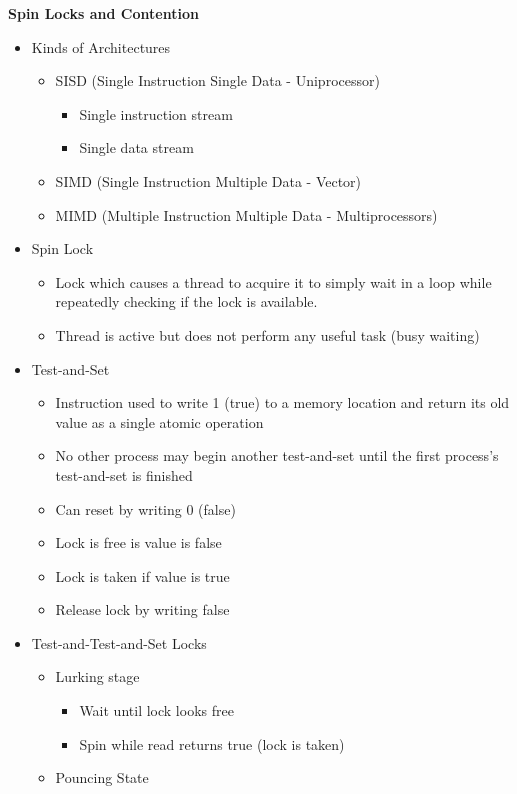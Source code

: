 \documentclass[12pt]{article}
\newcommand{\cname}[1]{\large \textbf{#1}}
\begin{document}
{\pagebreak
\cname{Spin Locks and Contention}
\begin{itemize}
	\item Kinds of Architectures
	\begin{itemize}
		\item SISD (Single Instruction Single Data - Uniprocessor)
		\begin{itemize}
			\item Single instruction stream
			\item Single data stream
		\end{itemize}
		\item SIMD (Single Instruction Multiple Data - Vector)
		\item MIMD (Multiple Instruction Multiple Data - Multiprocessors)
	\end{itemize}
	\item Spin Lock
	\begin{itemize}
		\item Lock which causes a thread to acquire it to simply wait in a loop while repeatedly checking if the lock is available.
		\item Thread is active but does not perform any useful task (busy waiting)
	\end{itemize}
	\item Test-and-Set
	\begin{itemize}
		\item Instruction used to write 1 (true) to a memory location and return its old value as a single atomic operation
		\item No other process may begin another test-and-set until the first process's test-and-set is finished
		\item Can reset by writing 0 (false)
		\item Lock is free is value is false
		\item Lock is taken if value is true
		\item Release lock by writing false
	\end{itemize}
	\item Test-and-Test-and-Set Locks
	\begin{itemize}
		\item Lurking stage
		\begin{itemize}
			\item Wait until lock looks free
			\item Spin while read returns true (lock is taken)
		\end{itemize}
		\item Pouncing State

\end{itemize}
\end{itemize}}
\end{document}
